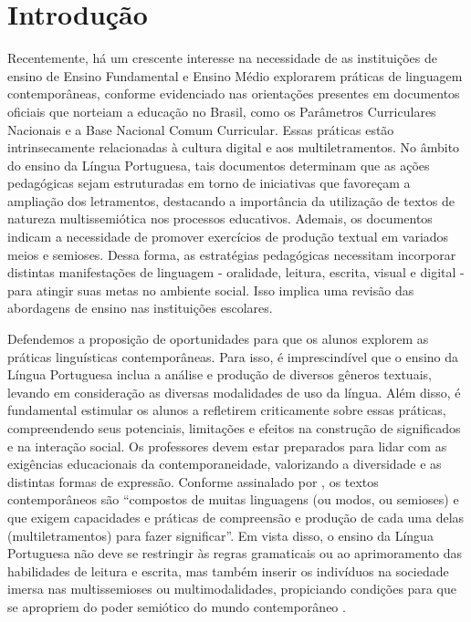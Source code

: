 \documentclass[portuguese]{textolivre}
\begin{document}
\begin{polyabstract}
\begin{english}
\begin{abstract}
\end{abstract}
\end{english}
\end{polyabstract}

\section{Introdução}

Recentemente, há um crescente interesse na necessidade de as instituições de ensino de Ensino Fundamental e Ensino Médio explorarem práticas de linguagem contemporâneas, conforme evidenciado nas orientações presentes em documentos oficiais que norteiam a educação no Brasil, como os Parâmetros Curriculares Nacionais e a Base Nacional Comum Curricular. Essas práticas estão intrinsecamente relacionadas à cultura digital e aos multiletramentos. No âmbito do ensino da Língua Portuguesa, tais documentos determinam que as ações pedagógicas sejam estruturadas em torno de iniciativas que favoreçam a ampliação dos letramentos, destacando a importância da utilização de textos de natureza multissemiótica nos processos educativos. Ademais, os documentos indicam a necessidade de promover exercícios de produção textual em variados meios e semioses. Dessa forma, as estratégias pedagógicas necessitam incorporar distintas manifestações de linguagem - oralidade, leitura, escrita, visual e digital - para atingir suas metas no ambiente social. Isso implica uma revisão das abordagens de ensino nas instituições escolares.

Defendemos a proposição de oportunidades para que os alunos explorem as práticas linguísticas contemporâneas. Para isso, é imprescindível que o ensino da Língua Portuguesa inclua a análise e produção de diversos gêneros textuais, levando em consideração as diversas modalidades de uso da língua. Além disso, é fundamental estimular os alunos a refletirem criticamente sobre essas práticas, compreendendo seus potenciais, limitações e efeitos na construção de significados e na interação social. Os professores devem estar preparados para lidar com as exigências educacionais da contemporaneidade, valorizando a diversidade e as distintas formas de expressão. Conforme assinalado por \textcite[p. 19]{rojo2012}, os textos contemporâneos são “compostos de muitas linguagens (ou modos, ou semioses) e que exigem capacidades e práticas de compreensão e produção de cada uma delas (multiletramentos) para fazer significar”. Em vista disso, o ensino da Língua Portuguesa não deve se restringir às regras gramaticais ou ao aprimoramento das habilidades de leitura e escrita, mas também inserir os indivíduos na sociedade imersa nas multissemioses ou multimodalidades, propiciando condições para que se apropriem do poder semiótico do mundo contemporâneo \cite{kress2003literacy}.
\end{document}
